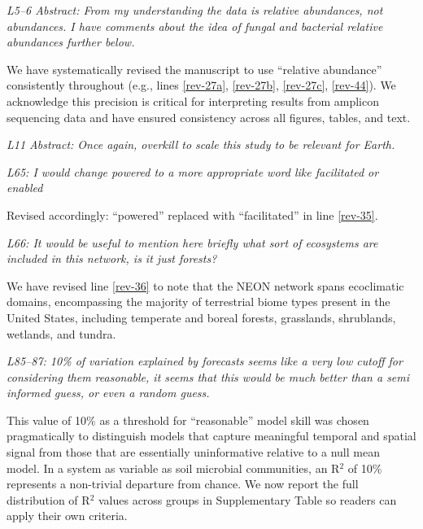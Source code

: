 \documentclass[11pt]{article}
\begin{document}
\bigskip

\textit{L5--6 Abstract: From my understanding the data is relative abundances, not abundances. I have comments about the idea of fungal and bacterial relative abundances further below.}

We have systematically revised the manuscript to use ``relative abundance'' consistently throughout (e.g., lines \ref{rev-27a}, \ref{rev-27b}, \ref{rev-27c}, \ref{rev-44}). We acknowledge this precision is critical for interpreting results from amplicon sequencing data and have ensured consistency across all figures, tables, and text.

\bigskip

\textit{L11 Abstract: Once again, overkill to scale this study to be relevant for Earth.}

\bigskip

\textit{L65: I would change powered to a more appropriate word like facilitated or enabled}

Revised accordingly: ``powered'' replaced with ``facilitated'' in line \ref{rev-35}.

\bigskip

\textit{L66: It would be useful to mention here briefly what sort of ecosystems are included in this network, is it just forests?}

We have revised line \ref{rev-36} to note that the NEON network spans %
 ecoclimatic domains, encompassing the majority of terrestrial biome types present in the United States, including temperate and boreal forests, grasslands, shrublands, wetlands, and tundra.

\bigskip

\textit{L85--87: 10\% of variation explained by forecasts seems like a very low cutoff for considering them reasonable, it seems that this would be much better than a semi informed guess, or even a random guess.}

This value of 10\% as a threshold for ``reasonable'' model skill was chosen pragmatically to distinguish models that capture meaningful temporal and spatial signal from those that are essentially uninformative relative to a null mean model. In a system as variable as soil microbial communities, an R$^2$ of 10\% represents a non-trivial departure from chance. We now report the full distribution of R$^2$ values across groups in Supplementary Table %
 so readers can apply their own criteria.

\bigskip
\end{document}
